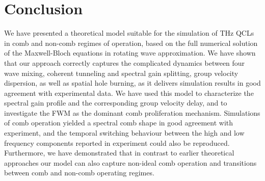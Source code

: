 \documentclass[journal]{IEEEtran}
\begin{document}
\section{Conclusion}
We have presented a theoretical model suitable for the simulation of THz QCLs in comb and non-comb regimes of operation, based on the full numerical solution of the Maxwell-Bloch equations in rotating wave approximation. We have shown that our approach correctly captures the complicated dynamics between four wave mixing, coherent tunneling and spectral gain splitting, group velocity dispersion, as well as spatial hole burning, as it delivers simulation results in good agreement with experimental data. We have used this model to characterize the spectral gain profile and the corresponding group velocity delay, and to investigate the FWM as the dominant comb proliferation mechanism. Simulations of comb operation yielded a spectral comb shape in good agreement with experiment, and the temporal switching behaviour between the high and low frequency components reported in experiment could also be reproduced. Furthermore, we have demonstrated that in contrast to earlier theoretical approaches our model can also capture non-ideal comb operation and transitions between comb and non-comb operating regimes.





\end{document}
